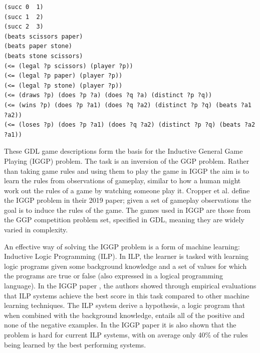 \begin{listing}[ht]
\begin{verbatim}
(succ 0  1)
(succ 1  2)
(succ 2  3)
(beats scissors paper)
(beats paper stone)
(beats stone scissors)
(<= (legal ?p scissors) (player ?p))
(<= (legal ?p paper) (player ?p))
(<= (legal ?p stone) (player ?p))
(<= (draws ?p) (does ?p ?a) (does ?q ?a) (distinct ?p ?q))
(<= (wins ?p) (does ?p ?a1) (does ?q ?a2) (distinct ?p ?q) (beats ?a1 ?a2))
(<= (loses ?p) (does ?p ?a1) (does ?q ?a2) (distinct ?p ?q) (beats ?a2 ?a1))
\end{verbatim}
\caption{A sample of rules from the GDL description of Rock Paper Scissors. The $?$ indicates a variable and $<=$ indicates an implication with the first expression after being the head and the conjugation of the rest making up the body}
\end{listing}


These GDL game descriptions form the basis for the Inductive General Game Playing (IGGP) problem. The task is an inversion of the GGP problem. Rather than taking game rules and using them to play the game in IGGP the aim is to learn the rules from observations of gameplay, similar to how a human might work out the rules of a game by watching someone play it. Cropper et al. define the IGGP problem in their 2019 paper; given a set of gameplay observations the goal is to induce the rules of the game\cite{Cropper/IGGP}. The games used in IGGP are those from the GGP competition problem set, specified in GDL, meaning they are widely varied in complexity.


An effective way of solving the IGGP problem is a form of machine learning: Inductive Logic Programming (ILP). In ILP, the learner is tasked with learning logic programs given some background knowledge and a set of values for which the programs are true or false (also expressed in a logical programming language). In the IGGP paper \cite{Cropper/IGGP}, the authors showed through empirical evaluations that ILP systems achieve the best score in this task compared to other machine learning techniques. The ILP system derive a hypothesis, a logic program that when combined with the background knowledge, entails all of the positive and none of the negative examples\cite{Muggleton/ILP}. In the IGGP paper\cite{Cropper/IGGP} it is also shown that the problem is hard for current ILP systems, with on average only 40\% of the rules being learned by the best performing systems.

